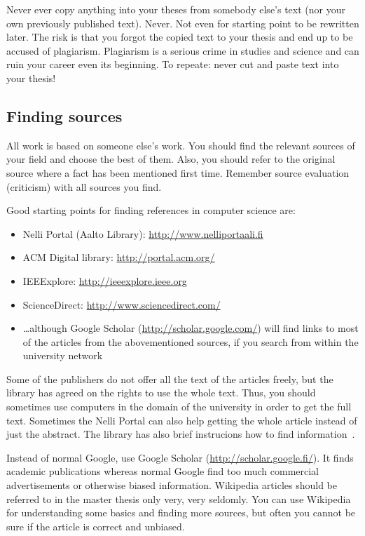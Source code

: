 \documentclass[12pt,a4paper,oneside,pdftex]{report}
\begin{document}
Never ever copy anything into your theses from somebody else's text
(nor your own previously published text). Never. Not even for starting
point to be rewritten later. The risk is that you forgot the copied
text to your thesis and end up to be accused of plagiarism. Plagiarism
is a serious crime in studies and science and can ruin your career
even its beginning. To repeate: never cut and paste text into your
thesis!

\subsection{Finding sources}

All work is based on someone else's work. You should find the relevant
sources of your field and choose the best of them. Also, you should
refer to the original source where a fact has been mentioned first
time. Remember source evaluation (criticism) with all sources you
find.

Good starting points for finding references in computer science are:
\begin{itemize}
\setlength{\itemsep}{0pt}
\item Nelli Portal (Aalto Library): \url{http://www.nelliportaali.fi}
\item ACM Digital library: \url{http://portal.acm.org/}
\item IEEExplore: \url{http://ieeexplore.ieee.org}
\item ScienceDirect: \url{http://www.sciencedirect.com/}
\item \ldots although Google Scholar (\url{http://scholar.google.com/}) will
find links to most of the articles from the abovementioned sources, if you
search from within the university network
\end{itemize}

Some of the publishers do not offer all the text of the articles
freely, but the library has agreed on the rights to use the whole
text. Thus, you should sometimes use computers in the domain of the
university in order to get the full text. Sometimes the Nelli Portal
can also help getting the whole article instead of just the abstract.
The library has also brief instrucions how to find
information~\cite{howfindinfo}.

Instead of normal Google, use Google Scholar
(\url{http://scholar.google.fi/}). It finds academic publications whereas
normal Google find too much commercial advertisements or otherwise
biased information. Wikipedia articles should be referred to in the master
thesis only very, very seldomly. You can use Wikipedia for understanding
some basics and finding more sources, but often you cannot be sure if
the article is correct and unbiased.
\end{document}
